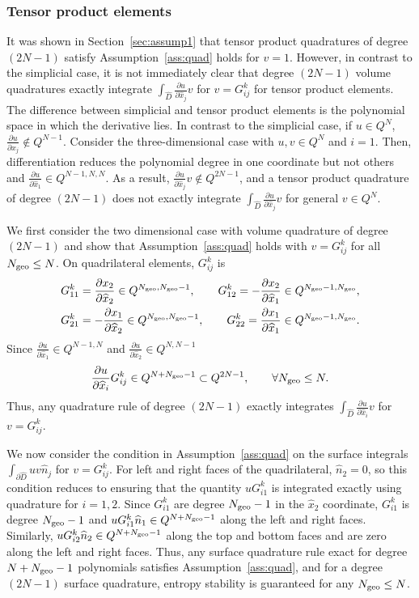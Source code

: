 \documentclass{svjour3}                     %
\renewcommand{\hat}{\widehat}
\newcommand{\pd}[2]{\frac{\partial#1}{\partial#2}}
\begin{document}
\subsubsection{Tensor product elements} 

It was shown in Section~\ref{sec:assump1} that tensor product quadratures of degree $(2N-1)$ satisfy Assumption~\ref{ass:quad} holds for $v = 1$.  However, in contrast to the simplicial case, it is not immediately clear that degree $(2N-1)$ volume quadratures exactly integrate $\int_{\hat{D}} \pd{u}{\hat{x}_j}v$ for $v = G^k_{ij}$ for tensor product elements.  The difference between simplicial and tensor product elements is the polynomial space in which the derivative lies.  In contrast to the simplicial case, if $u \in Q^N$, $\pd{u}{\hat{x}_j} \not\in Q^{N-1}$.  Consider the three-dimensional case with $u, v \in Q^N$ and $i = 1$.  Then, differentiation reduces the polynomial degree in one coordinate but not others and $\pd{u}{\hat{x}_1} \in Q^{N-1,N,N}$.  As a result, $\pd{u}{\hat{x}_j}v \not\in Q^{2N-1}$, and a tensor product quadrature of degree $(2N-1)$ does not exactly integrate $\int_{\hat{D}} \pd{u}{\hat{x}_j}v$ for general $v\in Q^N$.  

We first consider the two dimensional case with volume quadrature of degree $(2N-1)$ and show that Assumption~\ref{ass:quad} holds with $v = G^k_{ij}$ for all $N_{\rm geo} \leq N$.  On quadrilateral elements, $G^k_{ij}$ is
\begin{align*}
G^k_{11} &= \pd{x_2}{\hat{x}_2} \in Q^{N_{\rm geo}, N_{\rm geo}-1}, \qquad G^k_{12} = -\pd{x_2}{\hat{x}_1} \in Q^{N_{\rm geo}-1, N_{\rm geo}},\\
G^k_{21} &= -\pd{x_1}{\hat{x}_2} \in Q^{N_{\rm geo}, N_{\rm geo}-1}, \qquad G^k_{22} = \pd{x_1}{\hat{x}_1}\in Q^{N_{\rm geo}-1, N_{\rm geo}}.
\end{align*}
Since $\pd{u}{\hat{x}_1} \in Q^{N-1,N}$ and $\pd{u}{\hat{x}_2} \in Q^{N,N-1}$
\[
\pd{u}{\hat{x}_i}G^k_{ij} \in Q^{N+N_{\rm geo}-1} \subset Q^{2N-1}, \qquad \forall N_{\rm geo}\leq N.
\]
Thus, any quadrature rule of degree $(2N-1)$ exactly integrates $\int_{\hat{D}}\pd{u}{\hat{x}_i}v$ for $v = G^k_{ij}$.  

We now consider the condition in Assumption~\ref{ass:quad} on the surface integrals $\int_{\partial \hat{D}} u v \hat{n}_j$ for $v= G^k_{ij}$.  For left and right faces of the quadrilateral, $\hat{n}_2 = 0$, so this condition reduces to ensuring that the quantity $u G^k_{i1}$ is integrated exactly using quadrature for $i = 1,2$.  Since $G^k_{i1}$ are degree $N_{\rm geo}-1$ in the $\hat{x}_2$ coordinate, $G^k_{i1}$ is degree $N_{\rm geo}-1$ and $uG^k_{i1} \hat{n}_1 \in Q^{N+N_{\rm geo}-1}$ along the left and right faces.  Similarly, $uG^k_{i2} \hat{n}_2 \in Q^{N+N_{\rm geo}-1}$ along the top and bottom faces and are zero along the left and right faces.  Thus, any surface quadrature rule exact for degree $N+N_{\rm geo}-1$ polynomials satisfies Assumption~\ref{ass:quad}, and for a degree $(2N-1)$ surface quadrature, entropy stability is guaranteed for any $N_{\rm geo}\leq N$.
\end{document}
